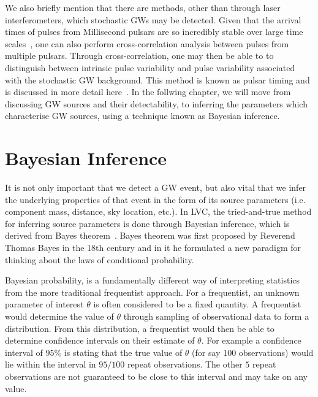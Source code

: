%
%
We also briefly mention that there are methods, other than through 
laser interferometers, which stochastic \ac{GW}s may be detected. 
Given that the arrival times of pulses from Millisecond pulsars are 
so incredibly stable over large time scales~\cite{Sathyaprakash2009}, 
one can also perform cross-correlation analysis  
between pulses from multiple pulsars. Through cross-correlation, 
one may then be able to to distinguish between 
intrinsic pulse variability and pulse variability associated with 
the stochastic \ac{GW} background. This method is known as 
pulsar timing and is discussed in more detail 
here~\cite{2018IAUS..337..158K}. In the follwing chapter, we will move 
from discussing \ac{GW} sources and their detectability, to inferring 
the parameters which characterise \ac{GW} sources, using a technique 
known as Bayesian inference.

\section{Bayesian Inference}\label{sec:bayesian_inference}

%
%
It is not only important that we detect a \ac{GW} event, but also 
vital that we 
infer the underlying properties of that event in the form of its 
source parameters (i.e. component mass, distance, sky location, etc.). 
In \ac{LVC}, the tried-and-true method for inferring source parameters is 
done through Bayesian inference, 
which is derived from Bayes theorem~\cite{Bayestheorem}. 
Bayes theorem was first proposed by Reverend Thomas Bayes in the 
18th century and in it he formulated a new paradigm for thinking 
about the laws of conditional probability. 

%
%
Bayesian probability, is a fundamentally different way of interpreting 
statistics from the more traditional frequentist approach. For a frequentist, 
an unknown parameter of interest $\theta$ is often considered to be a 
fixed quantity. A frequentist would determine the value of $\theta$ 
through sampling of observational data to form a distribution. From 
this distribution, a frequentist would then be able to determine 
confidence intervals on their estimate of $\theta$. For 
example a confidence interval of $95\%$ is stating 
that the true value of $\theta$ (for say 100 observations) would lie within the 
interval in $95/100$ repeat observations. The 
other $5$ repeat observations are not guaranteed to be close to this interval 
and may take on any value. 

